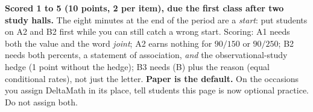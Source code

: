 \documentclass[10pt]{article}
\begin{document}
\begin{teachernote}[Homework]
\textbf{Scored 1 to 5 (10 points, 2 per item), due the first class after two study halls.} The eight
minutes at the end of the period are a \emph{start}: put students on A2 and B2 first while you
can still catch a wrong start. Scoring: A1 needs both the value and the word \emph{joint};
A2 earns nothing for $90/150$ or $90/250$; B2 needs both percents, a statement of association,
\emph{and} the observational-study hedge (1 point without the hedge); B3 needs (B) plus the
reason (equal conditional rates), not just the letter. \textbf{Paper is the default.} On the
occasions you assign DeltaMath in its place, tell
students this page is now optional practice. Do not assign both.
\end{teachernote}
\end{document}
